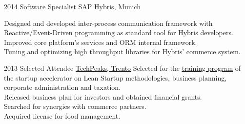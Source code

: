 \documentclass[letterpaper]{twentysecondcv} %
\begin{document}
\begin{twenty}
{	    }
        
  
    \twentyitem
   		{2014}
		{}
        {Software Specialist}
        {\href{http://www.hybris.com}{SAP Hybris, Munich}}
        {}
        {
        {
        Designed and developed inter-process communication framework with Reactive/Event-Driven programming as standard tool for Hybris developers.
        \\
        Improved core platform's services and ORM internal framework.\\
        Tuning and optimizing high throughput libraries for Hybris' commerce system.  

    }
        }
     
     \twentyitem
   		{2013}
		{}
        {Selected Attendee}
        {\href{https://www.repubblica.it/rubriche/startup-stories/2013/12/02/news/incubatore_startup-72502909/}{TechPeaks, Trento}}
        {}
        {
Selected for the \href{https://www.repubblica.it/rubriche/startup-stories/2013/12/02/news/incubatore_startup-72502909/}{\underline{training program}} of the startup accelerator on Lean Startup methodologies, business planning, corporate administration and taxation.\\
Released business plan for investors and obtained financial grants.\\
Searched for synergies with commerce partners.\\
Acquired license for food management.
    	}
    	

\end{twenty}
\end{document}
